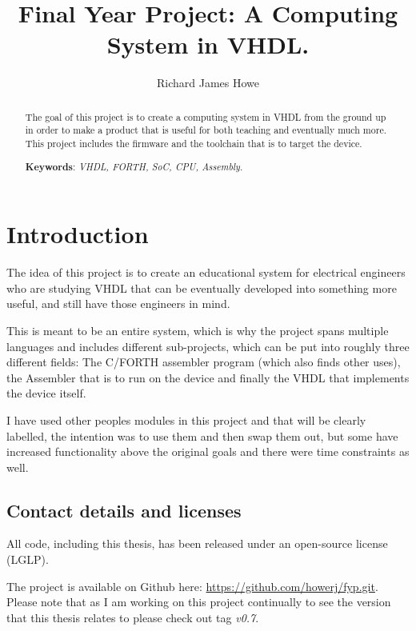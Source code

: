 \documentclass	[a4paper, 10pt]	{article}
\title		{Final Year Project: A Computing System in VHDL.}
\author		{Richard James Howe}
\begin{document}
	\maketitle
	\hrulefill

	\begin{abstract}
    The goal of this project is to create a computing system in VHDL from the
    ground up in order to make a product that is useful for both teaching and
    eventually much more. This project includes the firmware and the toolchain
    that is to target the device.

      \smallskip
      \begin{center}
      \noindent \textbf{Keywords}: \emph{VHDL, FORTH, SoC, CPU, Assembly.}
      \end{center}
	\end{abstract}

	\tableofcontents
  \listoffigures

  \section{Introduction}

  The idea of this project is to create an educational system for electrical
  engineers who are studying VHDL that can be eventually developed into something 
  more useful, and still have those engineers in mind. 

  This is meant to be an entire system, which is why the project spans multiple
  languages and includes different sub-projects, which can be put into roughly
  three different fields: The C/FORTH assembler program (which also finds other
  uses), the Assembler that is to run on the device and finally the VHDL that implements
  the device itself.

  I have used other peoples modules in this project and that will be clearly labelled,
  the intention was to use them and then swap them out, but some have increased
  functionality above the original goals and there were time constraints as well.

  \subsection{Contact details and licenses}

  All code, including this thesis, has been released under an open-source
  license (LGLP).

  The project is available on Github here: \url{https://github.com/howerj/fyp.git}. Please
  note that as I am working on this project continually to see the version that this
  thesis relates to please check out tag \emph{v0.7}.
\end{document}
